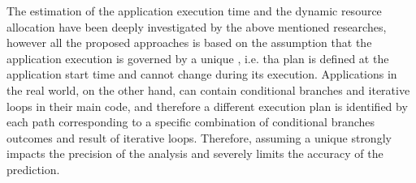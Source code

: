 The estimation of the application execution time and the dynamic resource allocation have been deeply investigated by the above mentioned researches, however all the proposed approaches is based on the assumption that the application execution is governed by a unique \plan, i.e. tha plan is defined at the application start time and cannot change during its execution. 
Applications in the real world, on the other hand, can contain conditional branches and iterative loops in their main code, and therefore a different execution plan is identified by each path corresponding to a specific combination of conditional branches outcomes and result of iterative loops. Therefore, assuming a unique \plan strongly impacts the precision of the analysis and severely limits the accuracy of the prediction. 
%
%
%
%
